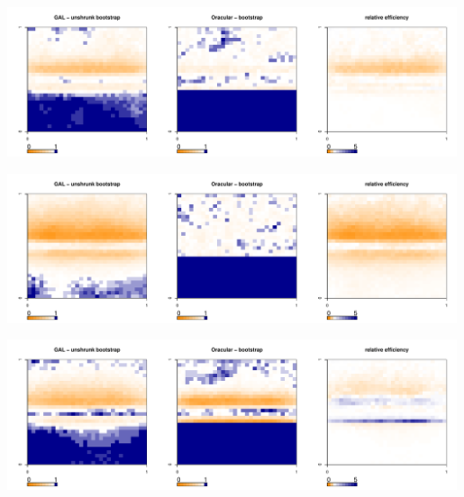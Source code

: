 \documentclass[authoryear, review, 11pt]{elsarticle}
\begin{document}
	\begin{center}
		\includegraphics[width=0.99\textwidth]{../../figures/X1-28-5.pdf}
		\label{fig:coveragemap5}
	\end{center}
	
	\begin{center}
		\includegraphics[width=0.99\textwidth]{../../figures/X1-28-6.pdf}
		\label{fig:coveragemap6}
	\end{center}
	
	\begin{center}
		\includegraphics[width=0.99\textwidth]{../../figures/X1-28-7.pdf}
		\label{fig:coveragemap7}
	\end{center}
		        
\end{document}
